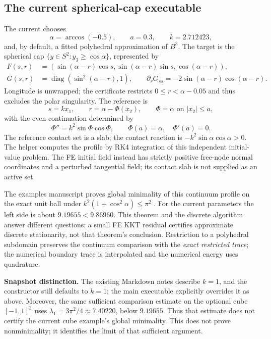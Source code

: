 \documentclass[11pt,a4paper]{article}
\newcommand{\code}[1]{\texttt{\detokenize{#1}}}
\newcommand{\diag}{\operatorname{diag}}
\begin{document}
\subsection{The current spherical-cap executable}
The current  chooses
\begin{equation}
 \alpha=\arccos(-0.5),\qquad a=0.3,\qquad k=2.712423,
\end{equation}
and, by default, a fitted polyhedral approximation of \(B^3\). The target
is the spherical cap \(\{y\in S^2:y_3\geq\cos\alpha\}\), represented by
\begin{align}
 F(s,r)&=(\sin(\alpha-r)\cos s,\sin(\alpha-r)\sin s,\cos(\alpha-r)),\\
 G(s,r)&=\diag(\sin^2(\alpha-r),1),
 \qquad \partial_rG_{ss}=-2\sin(\alpha-r)\cos(\alpha-r).
\end{align}
Longitude is unwrapped; the certificate restricts \(0\leq r<\alpha-0.05\)
and thus excludes the polar singularity. The reference is
\begin{equation}
 s=kx_1,\qquad r=\alpha-\Phi(x_2),\qquad
 \Phi=\alpha\text{ on }|x_2|\leq a,
\end{equation}
with the even continuation determined by
\begin{equation}
 \Phi''=k^2\sin\Phi\cos\Phi,\qquad \Phi(a)=\alpha,\quad \Phi'(a)=0.
\end{equation}
The reference contact set is a slab; the contact reaction is
\(-k^2\sin\alpha\cos\alpha>0\). The helper computes the profile by RK4
integration of this independent initial-value problem. The FE initial
field instead has strictly positive free-node normal coordinates and a
perturbed tangential field; its contact slab is not supplied as an active set.

The examples manuscript proves global minimality of this continuum
profile on the exact unit ball under
\(k^2(1+\cos^2\alpha)\leq\pi^2\) \cite{examples}. For the current
parameters the left side is about \(9.19655<9.86960\). This theorem and
the discrete algorithm answer different questions: a small FE KKT residual
certifies approximate discrete stationarity, not that theorem's conclusion.
Restriction to a polyhedral subdomain preserves the continuum comparison
with the \emph{exact restricted trace}; the numerical boundary trace is
interpolated and the numerical energy uses quadrature.

\textbf{Snapshot distinction.} The existing Markdown notes describe
\(k=1\), and the \code{RotatingProfile} constructor still defaults to
\(k=1\); the main executable explicitly overrides it as above. Moreover,
the same sufficient comparison estimate on the optional cube
\([-1,1]^3\) uses \(\lambda_1=3\pi^2/4\approx7.40220\), below
\(9.19655\). Thus that estimate does not certify the current cube example's
global minimality. This does not prove nonminimality; it identifies the
limit of that sufficient argument.
\end{document}

